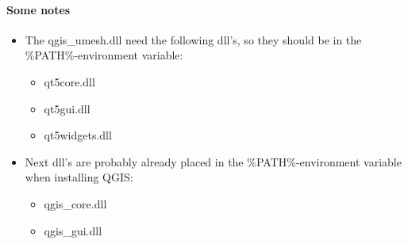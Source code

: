 \documentclass{deltares_memo}
\newcommand{\qumesh}{qgis\_umesh\xspace}
\begin{document}
\paragraph*{Some notes}
\phantom{mooiman}\vspace{-\baselineskip}
\begin{itemize}
\item The \qumesh.dll need the following dll's, so they should be in the \%PATH\%-environment variable:
\begin{itemize}
    \item qt5core.dll
    \item qt5gui.dll
    \item qt5widgets.dll
\end{itemize}

\item Next dll's are probably already placed in the \%PATH\%-environment variable when installing QGIS:
\begin{itemize} 
    \item qgis\_core.dll
    \item qgis\_gui.dll
\end{itemize} 
\end{itemize}
\end{document}
